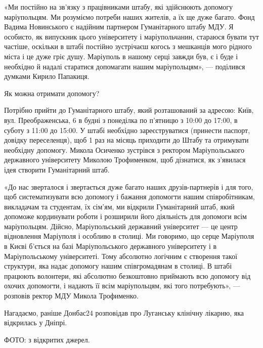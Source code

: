 «Ми постійно на зв'язку з працівниками штабу, які здійснюють допомогу
маріупольцям. Ми розуміємо потреби наших жителів, а їх ще дуже багато. Фонд
Вадима Новинського є надійним партнером Гуманітарного штабу МДУ. Я особисто, як
випускник цього університету і маріупольчанин, стараюся бувати тут частіше,
оскільки в штабі постійно зустрічаєш когось з мешканців мого рідного міста і це
дуже гріє душу. Маріуполь в нашому серці завжди був, є і буде і необхідно й
надалі старатися допомагати нашим маріупольцям», — поділився думками Кирило
Папакиця.

Як можна отримати допомогу?

Потрібно прийти до Гуманітарного штабу, який розташований за адресою: Київ,
вул. Преображенська, 6 в будні з понеділка по п'ятницю з 10:00 до 17:00, в
суботу з 11:00 до 15:00. У штабі необхідно зареєструватися (принести паспорт,
довідку переселенця), щоб 1 раз на місяць приходити до Штабу та отримувати
необхідну допомогу. Микола Осиченко зустрівся з ректором Маріупольського
державного університету Миколою Трофименком, щоб дізнатися, як з'явилася ідея
створити Гуманітарний штаб.

«До нас зверталося і звертається дуже багато наших друзів-партнерів і для того,
щоб систематизувати всю допомогу і бажання допомогти нашим співробітникам,
викладачам та студентам, їх сім'ям, ми відкрили Гуманітарний штаб, який
допоможе кординувати роботи і розширили його діяльність для допомоги всім
маріупольцям. Дійсно, Маріупольський державний університет — це центр
відновлення Маріуполя і особливо в столиці. Ми говоримо, що серце Маріуполя в
Києві б'ється на базі Маріупольського державного університету і в
Маріупольському університеті. Тому абсолютно логічним є створення такої
структури, яка надає допомогу нашим співгромадянам в столиці. В штабі працюють
волонтери, які абсолютно безкоштовно приймають всю допомогу від охочих
допомогти, і надають її всім маріупольцям, які того потребують», — розповів
ректор МДУ Микола Трофименко.

Нагадаємо, раніше Донбас24 розповідав про Луганську клінічну лікарню, яка
відкрилась у Дніпрі.

ФОТО: з відкритих джерел.
